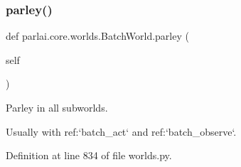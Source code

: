 \subsubsection{\texorpdfstring{parley()}{parley()}}
{\footnotesize\ttfamily def parlai.\+core.\+worlds.\+Batch\+World.\+parley (\begin{DoxyParamCaption}\item[{}]{self }\end{DoxyParamCaption})}

\begin{DoxyVerb}Parley in all subworlds.

Usually with ref:`batch_act` and ref:`batch_observe`.
\end{DoxyVerb}
 

Definition at line 834 of file worlds.\+py.


